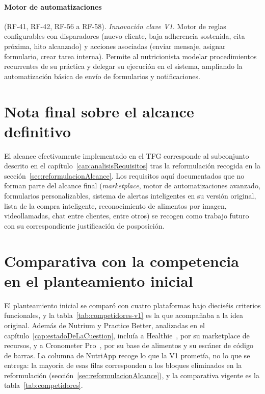 \paragraph{Motor de automatizaciones} (RF-41, RF-42, RF-56 a RF-58). \textit{Innovación clave V1.} Motor de reglas configurables con disparadores (nuevo cliente, baja adherencia sostenida, cita próxima, hito alcanzado) y acciones asociadas (enviar mensaje, asignar formulario, crear tarea interna). Permite al nutricionista modelar procedimientos recurrentes de su práctica y delegar su ejecución en el sistema, ampliando la automatización básica de envío de formularios y notificaciones.


\section{Nota final sobre el alcance definitivo}

El alcance efectivamente implementado en el TFG corresponde al subconjunto descrito en el capítulo~\ref{cap:analisisRequisitos} tras la reformulación recogida en la sección~\ref{sec:reformulacionAlcance}. Los requisitos aquí documentados que no forman parte del alcance final (\textit{marketplace}, motor de automatizaciones avanzado, formularios personalizables, sistema de alertas inteligentes en su versión original, lista de la compra inteligente, reconocimiento de alimentos por imagen, videollamadas, chat entre clientes, entre otros) se recogen como trabajo futuro con su correspondiente justificación de posposición.


\section{Comparativa con la competencia en el plan\-tea\-miento inicial}
\label{sec:competidores-v1}

El planteamiento inicial se comparó con cuatro plataformas bajo dieciséis criterios funcionales, y la tabla~\ref{tab:competidores-v1} es la que acompañaba a la idea original. Además de Nutrium y Practice Better, analizadas en el capítulo~\ref{cap:estadoDeLaCuestion}, incluía a Healthie~\citep{healthie}, por su marketplace de recursos, y a Cronometer Pro~\citep{cronometer}, por su base de alimentos y su escáner de código de barras. La columna de NutriApp recoge lo que la V1 prometía, no lo que se entrega: la mayoría de esas filas corresponden a los bloques eliminados en la reformulación (sección~\ref{sec:reformulacionAlcance}), y la comparativa vigente es la tabla~\ref{tab:competidores}.

